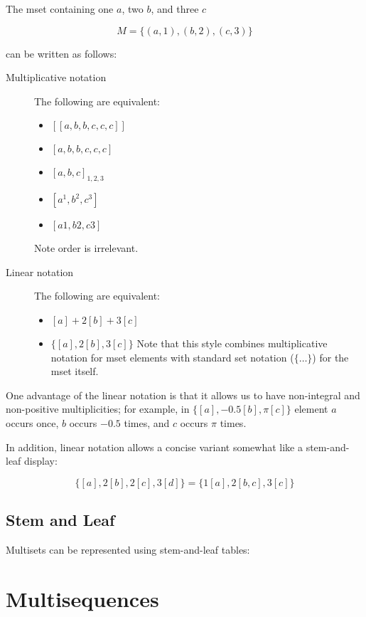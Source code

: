 The mset containing one $a$, two $b$, and three $c$

\begin{equation}
  M = \{(a,1), (b,2), (c, 3)\}
\end{equation}

\noindent can be written as follows:

\begin{description}
\item [Multiplicative notation]  The following are equivalent:

\begin{itemize}
\item $[[a,b,b,c,c,c]]$
\item $[a,b,b,c,c,c]$
\item $[a,b,c]_{1,2,3}$
\item $[a^1,b^2,c^3]$
\item $[a1,b2,c3]$
\end{itemize}

Note order is irrelevant.

\item [Linear notation]  The following are equivalent:

\begin{itemize}
\item $[a]+2[b]+3[c]$
\item $\{[a],2[b],3[c]\}$ Note that this style combines multiplicative
  notation for mset elements with standard set notation ($\{\ldots\}$)
  for the mset itself.
\end{itemize}
\end{description}

One advantage of the linear notation is that it allows us to have
non-integral and non-positive multiplicities; for example, in
$\{[a],-0.5[b],\pi[c]\}$ element $a$ occurs once, $b$ occurs $-0.5$
times, and $c$ occurs $\pi$ times.

In addition, linear notation allows a concise variant somewhat like a
stem-and-leaf display:

$$\{[a],2[b],2[c],3[d]\} = \{1[a], 2[b,c], 3[c]\}$$

\subsection{Stem and Leaf}

Multisets can be represented using stem-and-leaf tables:

\section{Multisequences}

